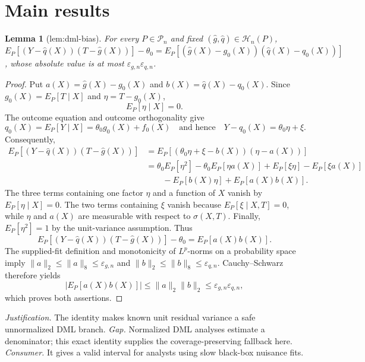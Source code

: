 \documentclass{article}
\newtheorem{lemma}{Lemma}
\begin{document}
\section{Main results}

\begin{lemma}[lem:dml-bias]\label{lem:dml-bias}
For every \(P\in\mathcal P_n\) and fixed \((\widehat g,\widehat q)\in\mathcal H_n(P)\), \(E_P[(Y-\widehat q(X))(T-\widehat g(X))]-\theta_0=E_P[(\widehat g(X)-g_0(X))(\widehat q(X)-q_0(X))]\), whose absolute value is at most \(\varepsilon_{g,n}\varepsilon_{q,n}\).
\end{lemma}
\begin{proof}
Put \(a(X)=\widehat g(X)-g_0(X)\) and \(b(X)=\widehat q(X)-q_0(X)\).  Since \(g_0(X)=E_P[T\mid X]\) and \(\eta=T-g_0(X)\),
\[
E_P[\eta\mid X]=0.
\]
The outcome equation and outcome orthogonality give
\[
q_0(X)=E_P[Y\mid X]=\theta_0g_0(X)+f_0(X)
\quad\text{and hence}\quad
Y-q_0(X)=\theta_0\eta+\xi.
\]
Consequently,
\[
\begin{aligned}
E_P[(Y-\widehat q(X))(T-\widehat g(X))]
&=E_P[(\theta_0\eta+\xi-b(X))(\eta-a(X))]\\
&=\theta_0E_P[\eta^2]-\theta_0E_P[\eta a(X)]
  +E_P[\xi\eta]-E_P[\xi a(X)]\\
&\hspace{2em}-E_P[b(X)\eta]+E_P[a(X)b(X)].
\end{aligned}
\]
The three terms containing one factor \(\eta\) and a function of \(X\) vanish by \(E_P[\eta\mid X]=0\).  The two terms containing \(\xi\) vanish because \(E_P[\xi\mid X,T]=0\), while \(\eta\) and \(a(X)\) are measurable with respect to \(\sigma(X,T)\).  Finally, \(E_P[\eta^2]=1\) by the unit-variance assumption.  Thus
\[
E_P[(Y-\widehat q(X))(T-\widehat g(X))]-\theta_0=E_P[a(X)b(X)].
\]
The supplied-fit definition and monotonicity of \(L^p\)-norms on a probability space imply \(\lVert a\rVert_2\le\lVert a\rVert_8\le\varepsilon_{g,n}\) and \(\lVert b\rVert_2\le\lVert b\rVert_8\le\varepsilon_{q,n}\).  Cauchy--Schwarz therefore yields
\[
\left|E_P[a(X)b(X)]\right|
\le \lVert a\rVert_2\lVert b\rVert_2
\le\varepsilon_{g,n}\varepsilon_{q,n},
\]
which proves both assertions.
\end{proof}
\par\smallskip\noindent \textit{Justification.} The identity makes known unit residual variance a safe unnormalized DML branch. \textit{Gap.} Normalized DML analyses estimate a denominator; this exact identity supplies the coverage-preserving fallback here. \textit{Consumer.} It gives a valid interval for analysts using slow black-box nuisance fits.
\end{document}
